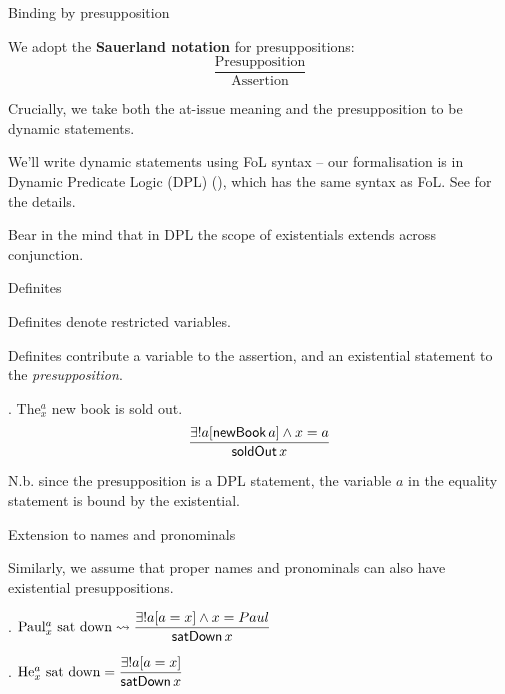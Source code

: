 \documentclass{beamer}
\begin{document}
\begin{frame}[allowframebreaks]{Binding by presupposition}

We adopt the {\bf Sauerland notation} for presuppositions:
$$\displaystyle\frac{\text{Presupposition}}{\text{Assertion}}$$

Crucially, we take both the at-issue meaning and the presupposition to be dynamic statements.

We'll write dynamic statements using FoL syntax -- our formalisation is in Dynamic Predicate Logic (DPL) (\citealt{groenendijk_dynamic_1991}), which has the same syntax as FoL. See \citet{elliottSudoLenls,elliottSudoCat} for the details.

Bear in the mind that in DPL the scope of existentials extends across conjunction.

\end{frame}

\begin{frame}{Definites}

  \begin{description}

    \item[Orthodox theories]
      Definites denote restricted variables.

      \item[Our theory]
      Definites contribute a variable to the assertion, and an existential statement to the \textit{presupposition}.

  \end{description}

  \ex. The$^a_x$ new book is sold out.
  $$\displaystyle\frac{\exists ! a[\textsf{newBook}\,a] \wedge x = a}{\textsf{soldOut}\,x}$$

  N.b. since the presupposition is a DPL statement, the variable \(a\) in the equality statement is bound by the existential.

\end{frame}

\begin{frame}{Extension to names and pronominals}

  Similarly, we assume that proper names and pronominals can also have existential presuppositions.

  \ex. $\text{Paul$^{a}_{x}$ sat down} \rightsquigarrow \displaystyle\frac{\exists ! a[a = x] \wedge x = Paul}{\textsf{satDown}\,x}$

  \ex. $\text{He$^{a}_{x}$ sat down} = \displaystyle\frac{\exists ! a[a = x]}{\textsf{satDown}\,x}$

\end{frame}
\end{document}
